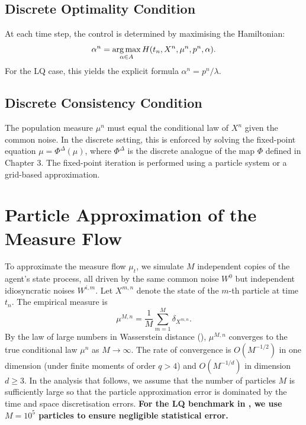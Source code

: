 \subsection{Discrete Optimality Condition}

At each time step, the control is determined by maximising the Hamiltonian:
\begin{equation}
    \alpha^n = \operatorname*{arg\,max}_{\alpha \in A} H(t_n, X^n, \mu^n, p^n, \alpha).
    \label{eq:discrete-optimality}
\end{equation}
For the LQ case, this yields the explicit formula $\alpha^n = p^n / \lambda$.

\subsection{Discrete Consistency Condition}

The population measure $\mu^n$ must equal the conditional law of $X^n$ given the
common noise. In the discrete setting, this is enforced by solving the fixed-point
equation $\mu = \Phi^\Delta(\mu)$, where $\Phi^\Delta$ is the discrete analogue of the
map $\Phi$ defined in Chapter 3. The fixed-point iteration is performed using a
particle system or a grid-based approximation.


\section{Particle Approximation of the Measure Flow}
\label{sec:na-particle}

To approximate the measure flow $\mu_t$, we simulate $M$ independent copies of the
agent's state process, all driven by the same common noise $W^0$ but independent
idiosyncratic noises $W^{i,m}$. Let $X^{m,n}$ denote the state of the $m$-th particle
at time $t_n$. The empirical measure is
\begin{equation}
    \mu^{M,n} = \frac{1}{M}\sum_{m=1}^M \delta_{X^{m,n}}.
    \label{eq:empirical-measure-discrete}
\end{equation}
By the law of large numbers in Wasserstein distance (),
$\mu^{M,n}$ converges to the true conditional law $\mu^n$ as $M \to \infty$. The rate
of convergence is $O(M^{-1/2})$ in one dimension (under finite moments of order
$q > 4$) and $O(M^{-1/d})$ in dimension $d \geq 3$. In the analysis that follows, we
assume that the number of particles $M$ is sufficiently large so that the particle
approximation error is dominated by the time and space discretisation errors.
\textbf{For the LQ benchmark in , we use $M = 10^5$ particles
to ensure negligible statistical error.}

